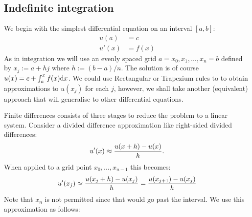 \subsection{Indefinite integration}
We begin with the simplest differential equation on an interval $[a,b]$:
\begin{align*}
u(a) &= c \\
u'(x) &= f(x)
\end{align*}
As in integration we will use an evenly spaced grid $a = x_0 , x_1 , \ensuremath{\ldots}, x_n = b$ defined by $x_j :=  a + h j$ where $h := (b-a)/n$. The solution is of course $u(x) = c + \ensuremath{\int}_a^x f(x) {\rm d}x$. We could use Rectangular or Trapezium rules to to obtain approximations to $u(x_j)$ for each $j$, however, we shall take another (equivalent) approach that will generalise to other differential equations. 

Finite differences consists of three stages to reduce the problem to a linear system. Consider a divided difference approximation like right-sided divided differences: 
\[
u'(x) \ensuremath{\approx} {u(x+h) - u(x)\over h}.
\]
When applied to a grid point $x_0,\ensuremath{\ldots},x_{n-1}$ this becomes:
\[
u'(x_j) \ensuremath{\approx} {u(x_j+h) - u(x_j)\over h} = {u(x_{j+1}) - u(x_j)\over h}
\]
Note that $x_n$ is not permitted since that would go past the interval. We use this approximation as follows:

